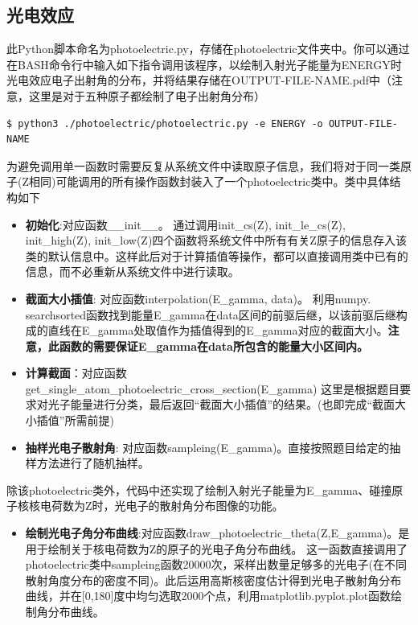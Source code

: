 \documentclass[12pt,a4paper]{article}%
\begin{document}
    \subsection{光电效应}
    此Python脚本命名为photoelectric.py，存储在photoelectric文件夹中。你可以通过在BASH命令行中输入如下指令调用该程序，以绘制入射光子能量为ENERGY时光电效应电子出射角的分布，并将结果存储在OUTPUT-FILE-NAME.pdf中（注意，这里是对于五种原子都绘制了电子出射角分布）\par
    
    \begin{lstlisting}[style=mystyle,label=code:bash]
$ python3 ./photoelectric/photoelectric.py -e ENERGY -o OUTPUT-FILE-NAME
    \end{lstlisting}

    为避免调用单一函数时需要反复从系统文件中读取原子信息，我们将对于同一类原子(Z相同)可能调用的所有操作函数封装入了一个photoelectric类中。类中具体结构如下
    \begin{tcolorbox}[width=16cm]
        \begin{itemize}
            \item \textbf{初始化}:对应函数\_\_init\_\_。
            通过调用init\_cs(Z), init\_le\_cs(Z), init\_high(Z), init\_low(Z)四个函数将系统文件中所有有关Z原子的信息存入该类的默认信息中。这样此后对于计算插值等操作，都可以直接调用类中已有的信息，而不必重新从系统文件中进行读取。
    
            \item \textbf{截面大小插值}: 对应函数interpolation(E\_gamma, data)。
            利用numpy. searchsorted函数找到能量E\_gamma在data区间的前驱后继，以该前驱后继构成的直线在E\_gamma处取值作为插值得到的E\_gamma对应的截面大小。\textbf{注意，此函数的需要保证E\_gamma在data所包含的能量大小区间内。}
    
            \item \textbf{计算截面}：对应函数get\_single\_atom\_photoelectric\_cross\_section(E\_gamma)
            这里是根据题目要求对光子能量进行分类，最后返回“截面大小插值”的结果。(也即完成“截面大小插值”所需前提)
    
            \item \textbf{抽样光电子散射角}: 
            对应函数sampleing(E\_gamma)。直接按照题目给定的抽样方法进行了随机抽样。
        \end{itemize}
    \end{tcolorbox}
    
    除该photoelectric类外，代码中还实现了绘制入射光子能量为E\_gamma、碰撞原子核核电荷数为Z时，光电子的散射角分布图像的功能。\par
    \begin{tcolorbox}[width=16cm]
        \begin{itemize}
            \item \textbf{绘制光电子角分布曲线}:对应函数draw\_photoelectric\_theta(Z,E\_gamma)。是用于绘制关于核电荷数为Z的原子的光电子角分布曲线。 这一函数直接调用了photoelectric类中sampleing函数20000次，采样出数量足够多的光电子(在不同散射角度分布的密度不同)。此后运用高斯核密度估计得到光电子散射角分布曲线，并在[0,180]度中均匀选取2000个点，利用matplotlib.pyplot.plot函数绘制角分布曲线。   
        \end{itemize}
    \end{tcolorbox}
    
\end{document}

